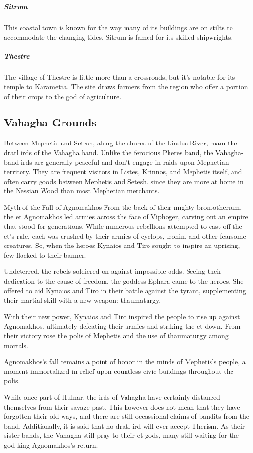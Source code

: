         \subparagraph{Sitrum} This coastal town is known for the way many of its buildings are on stilts to accommodate the changing tides.
        Sitrum is famed for its skilled shipwrights.

        \subparagraph{Thestre} The village of Thestre is little more than a crossroads, but it's notable for its temple to Karametra.
        The site draws farmers from the region who offer a portion of their crops to the god of agriculture.

\subsection*{Vahagha Grounds}
    Between Mephetis and Setesh, along the shores of the Lindus River, roam the dratl irds of the Vahagha band.
    Unlike the ferocious Pheres band, the Vahagha-band irds are generally peaceful and don't engage in raids upon Mephetian territory.
    They are frequent visitors in Listes, Krinnos, and Mephetis itself, and often carry goods between Mephetis and Setesh, since they are more at home in the Nessian Wood than most Mephetian merchants.

    \begin{DndComment}[float=t]{Myth of the Fall of Agnomakhos}
        From the back of their mighty brontotherium, the et Agnomakhos led armies across the face of Viphoger, carving out an empire that stood for generations.
        While numerous rebellions attempted to cast off the et's rule, each was crushed by their armies of cyclops, leonin, and other fearsome creatures.
        So, when the heroes Kynaios and Tiro sought to inspire an uprising, few flocked to their banner.

        Undeterred, the rebels soldiered on against impossible odds.
        Seeing their dedication to the cause of freedom, the goddess Ephara came to the heroes.
        She offered to aid Kynaios and Tiro in their battle against the tyrant, supplementing their martial skill with a new weapon: thaumaturgy.

        With their new power, Kynaios and Tiro inspired the people to rise up against Agnomakhos, ultimately defeating their armies and striking the et down.
        From their victory rose the polis of Mephetis and the use of thaumaturgy among mortals.

        Agnomakhos's fall remains a point of honor in the minds of Mephetis's people, a moment immortalized in relief upon countless civic buildings throughout the polis.
    \end{DndComment}

    While once part of Hulnar, the irds of Vahagha have certainly distanced themselves from their savage past.
    This however does not mean that they have forgotten their old ways, and there are still occassional claims of bandits from the band.
    Additionally, it is said that no dratl ird will ever accept Therism.
    As their sister bands, the Vahagha still pray to their et gods, many still waiting for the god-king Agnomakhos's return.

\newpage~\newpage
